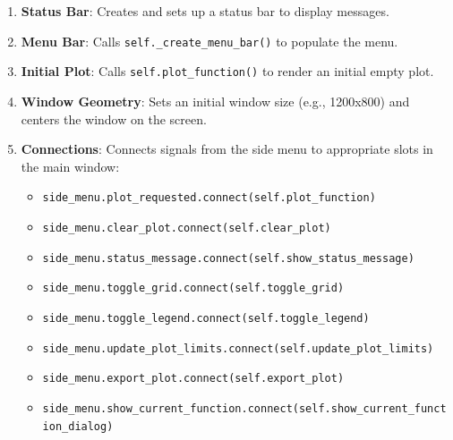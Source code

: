 \documentclass[12pt,a4paper]{report}
\begin{document}
\begin{itemize}
\begin{enumerate}
            \item \textbf{Status Bar}: Creates and sets up a status bar to display messages.
            \item \textbf{Menu Bar}: Calls \texttt{self.\_create\_menu\_bar()} to populate the menu.
            \item \textbf{Initial Plot}: Calls \texttt{self.plot\_function()} to render an initial empty plot.
            \item \textbf{Window Geometry}: Sets an initial window size (e.g., 1200x800) and centers the window on the screen.
            \item \textbf{Connections}: Connects signals from the side menu to appropriate slots in the main window:
                \begin{itemize}
                    \item \texttt{side\_menu.plot\_requested.connect(self.plot\_function)}
                    \item \texttt{side\_menu.clear\_plot.connect(self.clear\_plot)}
                    \item \texttt{side\_menu.status\_message.connect(self.show\_status\_message)}
                    \item \texttt{side\_menu.toggle\_grid.connect(self.toggle\_grid)}
                    \item \texttt{side\_menu.toggle\_legend.connect(self.toggle\_legend)}
                    \item \texttt{side\_menu.update\_plot\_limits.connect(self.update\_plot\_limits)}
                    \item \texttt{side\_menu.export\_plot.connect(self.export\_plot)}
                    \item \texttt{side\_menu.show\_current\_function.connect(self.show\_current\_function\_dialog)}
                \end{itemize}
        \end{enumerate}
\end{itemize}
\end{document}
